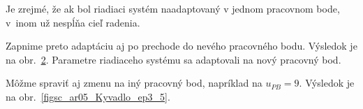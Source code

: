 \documentclass[a4paper, 10pt, ]{article}
\begin{document}
\begin{figure}[!b]
	\centering

    \vspace{-3mm}


    \vspace{-2mm}

	\caption{}
	\label{figsc_ar05_Kyvadlo_ep3_3}

    \vspace{-2mm}

\end{figure}



Je zrejmé, že ak bol riadiaci systém naadaptovaný v jednom pracovnom bode, v~inom už nespĺňa cieľ radenia.


\vfill

Zapnime preto adaptáciu aj po prechode do nevého pracovného bodu. Výsledok je na obr.~\ref{figsc_ar05_Kyvadlo_ep3_4}. Parametre riadiaceho systému sa adaptovali na nový pracovný bod.





\begin{figure}[!t]
	\centering

    \vspace{-3mm}


    \vspace{-2mm}

	\caption{}
	\label{figsc_ar05_Kyvadlo_ep3_4}

    \vspace{-2mm}

\end{figure}





Môžme spraviť aj zmenu na iný pracovný bod, napríklad na  $u_{PB} = 9$. Výsledok je na obr.~\ref{figsc_ar05_Kyvadlo_ep3_5}.
\end{document}
